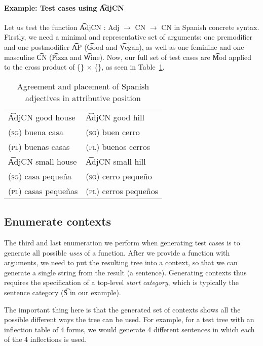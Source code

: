 \paragraph{Example: Test cases using \t{AdjCN}} Let us test the function
\t{AdjCN : Adj $\rightarrow$ CN $\rightarrow$ CN} in Spanish
concrete syntax. 
Firstly, we need a minimal and representative set of arguments:
one premodifier and one postmodifier \t{AP} (\t{Good} and
\t{Vegan}), as well as one feminine and one masculine
\t{CN} (\t{Pizza} and \t{Wine}). Now, our full set of test cases are
\t{Mod} applied to the cross product of \{\} $\times$ \{\}, as seen in Table~\ref{tab:adjAttr}.

\begin{table}[h]
\centering
\begin{tabular}{| l | l |}
\hline
\t{AdjCN good house}   & \t{AdjCN good hill} \\
\textsc{(sg)} buena casa            & \textsc{(sg)} buen cerro \\
\textsc{(pl)} buenas casas          & \textsc{(pl)} buenos cerros \\ \hline

\t{AdjCN small house}   & \t{AdjCN small hill} \\

\textsc{(sg)} casa peque\~{n}a            & \textsc{(sg)} cerro peque\~{n}o \\
\textsc{(pl)} casas peque\~{n}as          & \textsc{(pl)} cerros peque\~{n}os \\ \hline
\end{tabular}
\caption{Agreement and placement of Spanish adjectives in attributive position}
\label{tab:adjAttr}
\end{table}

\subsection{Enumerate contexts} The third and last enumeration we
perform when generating test cases is to generate all possible
\emph{uses} of a function. After we provide a function with arguments,
we need to put the resulting tree into a context, so that we can generate a
single string from the result (a sentence). Generating contexts thus requires the specification of a top-level \emph{start category}, which is typically the sentence category (\t{S} in our example).

The important thing here is that the generated set of contexts shows
all the possible different ways the tree can be used. For example, for
a test tree with an inflection table of 4 forms, we would generate 4 different sentences in which each of the 4 inflections is used.

